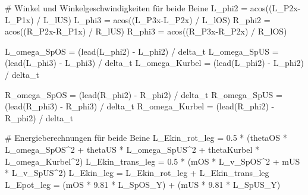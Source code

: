 \documentclass[
  letterpaper,
  DIV=11]{scrartcl}
\newenvironment{Shaded}{\begin{snugshade}}{\end{snugshade}}
\newcommand{\CommentTok}[1]{\textcolor[rgb]{0.37,0.37,0.37}{#1}}
\newcommand{\DecValTok}[1]{\textcolor[rgb]{0.68,0.00,0.00}{#1}}
\newcommand{\FloatTok}[1]{\textcolor[rgb]{0.68,0.00,0.00}{#1}}
\newcommand{\FunctionTok}[1]{\textcolor[rgb]{0.28,0.35,0.67}{#1}}
\newcommand{\NormalTok}[1]{\textcolor[rgb]{0.00,0.23,0.31}{#1}}
\newcommand{\OtherTok}[1]{\textcolor[rgb]{0.00,0.23,0.31}{#1}}
\newcommand{\SpecialCharTok}[1]{\textcolor[rgb]{0.37,0.37,0.37}{#1}}
\begin{document}
\begin{Shaded}
\begin{Highlighting}[]
\CommentTok{\# Winkel und Winkelgeschwindigkeiten für beide Beine}
\NormalTok{L\_phi2 }\OtherTok{=} \FunctionTok{acos}\NormalTok{((L\_P2x}\SpecialCharTok{{-}}\NormalTok{L\_P1x) }\SpecialCharTok{/}\NormalTok{ L\_lUS)}
\NormalTok{L\_phi3 }\OtherTok{=} \FunctionTok{acos}\NormalTok{((L\_P3x}\SpecialCharTok{{-}}\NormalTok{L\_P2x) }\SpecialCharTok{/}\NormalTok{ L\_lOS)}
\NormalTok{R\_phi2 }\OtherTok{=} \FunctionTok{acos}\NormalTok{((R\_P2x}\SpecialCharTok{{-}}\NormalTok{R\_P1x) }\SpecialCharTok{/}\NormalTok{ R\_lUS)}
\NormalTok{R\_phi3 }\OtherTok{=} \FunctionTok{acos}\NormalTok{((R\_P3x}\SpecialCharTok{{-}}\NormalTok{R\_P2x) }\SpecialCharTok{/}\NormalTok{ R\_lOS)}

\NormalTok{L\_omega\_SpOS }\OtherTok{=}\NormalTok{ (}\FunctionTok{lead}\NormalTok{(L\_phi2) }\SpecialCharTok{{-}}\NormalTok{ L\_phi2) }\SpecialCharTok{/}\NormalTok{ delta\_t}
\NormalTok{L\_omega\_SpUS }\OtherTok{=}\NormalTok{ (}\FunctionTok{lead}\NormalTok{(L\_phi3) }\SpecialCharTok{{-}}\NormalTok{ L\_phi3) }\SpecialCharTok{/}\NormalTok{ delta\_t}
\NormalTok{L\_omega\_Kurbel }\OtherTok{=}\NormalTok{ (}\FunctionTok{lead}\NormalTok{(L\_phi2) }\SpecialCharTok{{-}}\NormalTok{ L\_phi2) }\SpecialCharTok{/}\NormalTok{ delta\_t}

\NormalTok{R\_omega\_SpOS }\OtherTok{=}\NormalTok{ (}\FunctionTok{lead}\NormalTok{(R\_phi2) }\SpecialCharTok{{-}}\NormalTok{ R\_phi2) }\SpecialCharTok{/}\NormalTok{ delta\_t}
\NormalTok{R\_omega\_SpUS }\OtherTok{=}\NormalTok{ (}\FunctionTok{lead}\NormalTok{(R\_phi3) }\SpecialCharTok{{-}}\NormalTok{ R\_phi3) }\SpecialCharTok{/}\NormalTok{ delta\_t}
\NormalTok{R\_omega\_Kurbel }\OtherTok{=}\NormalTok{ (}\FunctionTok{lead}\NormalTok{(R\_phi2) }\SpecialCharTok{{-}}\NormalTok{ R\_phi2) }\SpecialCharTok{/}\NormalTok{ delta\_t}

\CommentTok{\# Energieberechnungen für beide Beine}
\NormalTok{L\_Ekin\_rot\_leg }\OtherTok{=} \FloatTok{0.5} \SpecialCharTok{*}\NormalTok{ (thetaOS }\SpecialCharTok{*}\NormalTok{ L\_omega\_SpOS}\SpecialCharTok{\^{}}\DecValTok{2} \SpecialCharTok{+}\NormalTok{ thetaUS }\SpecialCharTok{*}\NormalTok{ L\_omega\_SpUS}\SpecialCharTok{\^{}}\DecValTok{2} \SpecialCharTok{+}\NormalTok{ thetaKurbel }\SpecialCharTok{*}\NormalTok{ L\_omega\_Kurbel}\SpecialCharTok{\^{}}\DecValTok{2}\NormalTok{)}
\NormalTok{L\_Ekin\_trans\_leg }\OtherTok{=} \FloatTok{0.5} \SpecialCharTok{*}\NormalTok{ (mOS }\SpecialCharTok{*}\NormalTok{ L\_v\_SpOS}\SpecialCharTok{\^{}}\DecValTok{2} \SpecialCharTok{+}\NormalTok{ mUS }\SpecialCharTok{*}\NormalTok{ L\_v\_SpUS}\SpecialCharTok{\^{}}\DecValTok{2}\NormalTok{)}
\NormalTok{L\_Ekin\_leg }\OtherTok{=}\NormalTok{ L\_Ekin\_rot\_leg }\SpecialCharTok{+}\NormalTok{ L\_Ekin\_trans\_leg}
\NormalTok{L\_Epot\_leg }\OtherTok{=}\NormalTok{ (mOS }\SpecialCharTok{*} \FloatTok{9.81} \SpecialCharTok{*}\NormalTok{ L\_SpOS\_Y) }\SpecialCharTok{+}\NormalTok{ (mUS }\SpecialCharTok{*} \FloatTok{9.81} \SpecialCharTok{*}\NormalTok{ L\_SpUS\_Y)}


\end{Highlighting}
\end{Shaded}
\end{document}
